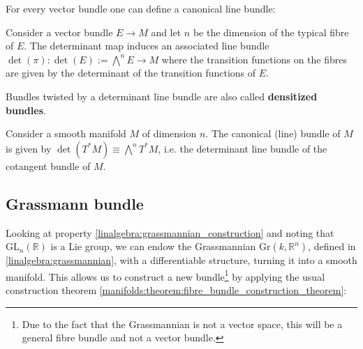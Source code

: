 
    For every vector bundle one can define a canonical line bundle:
    \begin{construct}
        Consider a vector bundle $E\rightarrow M$ and let $n$ be the dimension of the typical fibre of $E$. The determinant map induces an associated line bundle $\det(\pi):\det(E):=\bigwedge^nE\rightarrow M$ where the transition functions on the fibres are given by the determinant of the transition functions of $E$.

        Bundles twisted by a determinant line bundle are also called \textbf{densitized bundles}.
    \end{construct}
    \begin{example}\label{diff:canonical_bundle}
        Consider a smooth manifold $M$ of dimension $n$. The canonical (line) bundle of $M$ is given by $\det(T^*M)\equiv\bigwedge^nT^*M$, i.e. the determinant line bundle of the cotangent bundle of $M$.
    \end{example}

\subsection{Grassmann bundle}

    Looking at property \ref{linalgebra:grassmannian_construction} and noting that $\text{GL}_n(\mathbb{R})$ is a Lie group, we can endow the Grassmannian $\text{Gr}(k, \mathbb{R}^n)$, defined in \ref{linalgebra:grassmannian}, with a differentiable structure, turning it into a smooth manifold. This allows us to construct a new bundle\footnote{Due to the fact that the Grassmannian is not a vector space, this will be a general fibre bundle and not a vector bundle.} by applying the usual construction theorem \ref{manifolds:theorem:fibre_bundle_construction_theorem}:

